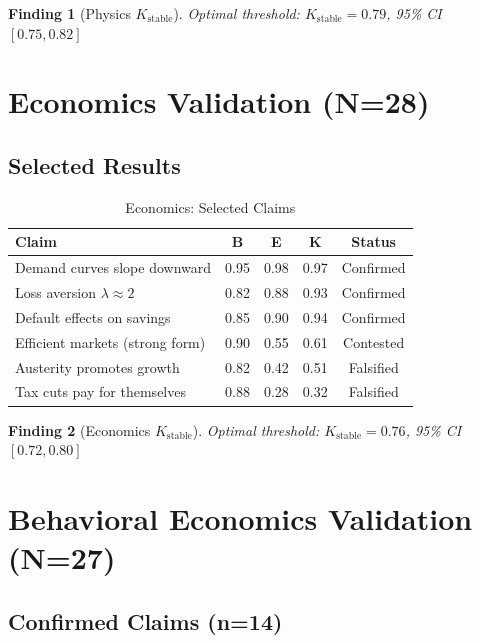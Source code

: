 \documentclass[11pt,a4paper]{article}
\newtheorem{finding}{Finding}[section]
\theoremstyle{remark}
\begin{document}
\begin{finding}[Physics $K_{\text{stable}}$]
Optimal threshold: $K_{\text{stable}} = 0.79$, 95\% CI $[0.75, 0.82]$
\end{finding}

\section{Economics Validation (N=28)}
\label{sec:economics}

\subsection{Selected Results}

\begin{table}[h]
\centering
\caption{Economics: Selected Claims}
\begin{tabular}{p{5.5cm}cccc}
\toprule
\textbf{Claim} & \textbf{B} & \textbf{E} & \textbf{K} & \textbf{Status} \\
\midrule
Demand curves slope downward & 0.95 & 0.98 & 0.97 & Confirmed \\
Loss aversion $\lambda \approx 2$ & 0.82 & 0.88 & 0.93 & Confirmed \\
Default effects on savings & 0.85 & 0.90 & 0.94 & Confirmed \\
Efficient markets (strong form) & 0.90 & 0.55 & 0.61 & Contested \\
Austerity promotes growth & 0.82 & 0.42 & 0.51 & Falsified \\
Tax cuts pay for themselves & 0.88 & 0.28 & 0.32 & Falsified \\
\bottomrule
\end{tabular}
\end{table}

\begin{finding}[Economics $K_{\text{stable}}$]
Optimal threshold: $K_{\text{stable}} = 0.76$, 95\% CI $[0.72, 0.80]$
\end{finding}

\section{Behavioral Economics Validation (N=27)}
\label{sec:behavioral}

\subsection{Confirmed Claims (n=14)}
\end{document}
